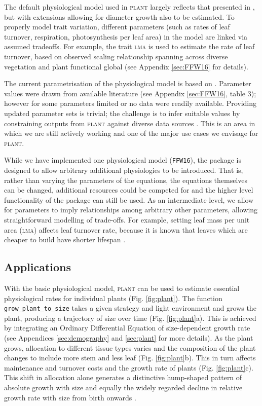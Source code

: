 \documentclass[a4paper,11pt]{article}
\newcommand{\plant}{\textsc{plant}}
\begin{document}
The default physiological model used in {\plant} largely reflects that
presented in \citet{Falster-2011}, but with extensions allowing for
diameter growth also to be estimated. To properly model trait
variation, different parameters (such as rates of leaf turnover,
respiration, photosynthesis per leaf area) in the model are linked via
assumed tradeoffs. For example, the trait \textsc{lma} is used to estimate the
rate of leaf turnover, based on observed scaling relationship spanning
across diverse vegetation and plant functional global
\citep{Wright-2004} (see Appendix \ref{sec:FFW16} for details).

The current parametrisation of the physiological model is based on
\citet{Falster-2011}. Parameter values were drawn from available
literature (see Appendix \ref{sec:FFW16}, table 3); however for some
parameters limited or no data were readily available. Providing
updated parameter sets is trivial; the challenge is to infer suitable
values by constraining outputs from {\plant} against diverse data
sources \citep{Lebauer-2012, Keenan-2013}. This is an area in which we
are still actively working and one of the major use cases we envisage
for {\plant}.


While we have implemented one physiological model (\texttt{FFW16}),
the package is designed to allow arbitrary additional physiologies to
be introduced.  That is, rather than varying the parameters of the
equations, the equations themselves can be changed, additional
resources could be competed for and the higher level functionality of
the package can still be used.  As an intermediate level, we allow for
parameters to imply relationships among arbitrary other parameters,
allowing straightforward modelling of trade-offs.  For example,
setting leaf mass per unit area (\textsc{lma}) affects leaf turnover rate,
because it is known that leaves which are cheaper to build have shorter 
lifespan \citep{Wright-2004}.

\subsection{Applications}

With the basic physiological model, {\plant} can be used to estimate
essential physiological rates for individual plants
(Fig. \ref{fig:plant}). The function \texttt{grow\_plant\_to\_size}
takes a given strategy and light environment and grows the plant,
producing a trajectory of size over time (Fig. \ref{fig:plant}a). This
is achieved by integrating an Ordinary Differential Equation of
size-dependent growth rate (see Appendices \ref{sec:demography} and
\ref{sec:plant} for more details). As the plant grows, allocation to
different tissue types varies and the composition of the plant
changes to include more stem and less leaf
(Fig. \ref{fig:plant}b). This in turn affects maintenance and turnover
costs and the growth rate of plants (Fig. \ref{fig:plant}c).  This
shift in allocation alone generates a distinctive hump-shaped pattern
of absolute growth with size \citep{King-2011} and equally the widely
regarded decline in relative growth rate with size from birth onwards
\citep{Enquist-2007}.
\end{document}
